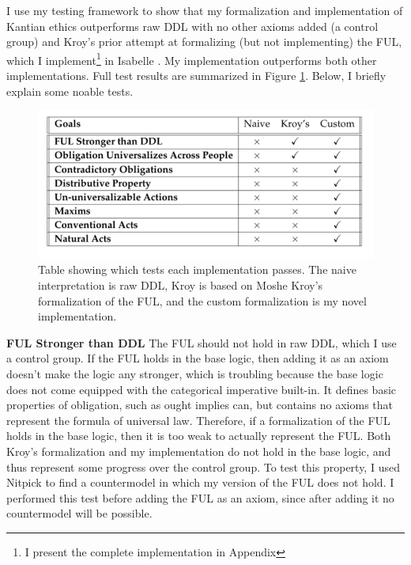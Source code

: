 \begin{isabellebody}
\begin{isamarkuptext}
I use my testing framework to show that my formalization and implementation of Kantian ethics outperforms 
raw DDL with no other axioms added (a control group) and Kroy's prior attempt at formalizing 
(but not implementing) the FUL, which I implement\footnote{I present the complete implementation in 
Appendix } in Isabelle \citep{kroy}. My implementation outperforms 
both other implementations. Full test results are summarized in Figure \ref{table}. Below, I briefly 
explain some noable tests.%
\end{isamarkuptext}\isamarkuptrue%
%
\begin{figure}
\centering
\includegraphics[scale=0.4]{goalstable.png}
\caption{Table showing which tests each implementation passes. The naive interpretation is raw DDL, 
Kroy is based on Moshe Kroy's formalization of the FUL, and the custom formalization is my novel implementation.} \label{table}
\end{figure}
%
\begin{isamarkuptext}%
\textbf{FUL Stronger than DDL} The FUL should not hold in raw DDL, which I use a control group. 
If the FUL holds in the base logic, then adding it as an axiom doesn't make the logic any stronger, 
which is troubling because the base logic does not come equipped with the categorical imperative built-in. It 
defines basic properties of obligation, such as ought implies can, but contains no axioms that represent
the formula of universal law. Therefore, if a formalization of the FUL holds in the 
base logic, then it is too weak to actually represent the FUL. Both Kroy's formalization
and my implementation do not hold in the base logic, and thus represent some progress over the control group.
To test this property, I used Nitpick to find a countermodel in which my version of the FUL does not hold. 
I performed this test before adding the FUL as an axiom, since after adding it no countermodel will
be possible.%
\end{isamarkuptext}\isamarkuptrue%

\end{isabellebody}
